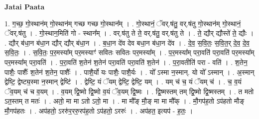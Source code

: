 \documentclass[17pt]{extarticle}
\begin{document}
\textbf{Jatai Paata} \newline

1. ग॒च्छ॒ गो॒स्थान॑म् गो॒स्थान॑म् गच्छ गच्छ गो॒स्थान᳚म् । . गो॒स्थानं॒ ॅवर्.ष॑तु॒ वर्.ष॑तु गो॒स्थान॑म् गो॒स्थानं॒ ॅवर्.ष॑तु । . गो॒स्थान॒मिति॑ गो - स्थान᳚म् । . वर्.ष॑तु ते ते॒ वर्.ष॑तु॒ वर्.ष॑तु ते । . ते॒ द्यौर् द्यौस्ते॑ ते॒ द्यौः । . द्यौर् ब॑धा॒न ब॑धा॒न द्यौर् द्यौर् ब॑धा॒न । . ब॒धा॒न दे॑व देव बधा॒न ब॑धा॒न दे॑व । . दे॒व॒ स॒वि॒तः॒ स॒वि॒त॒र् दे॒व॒ दे॒व॒ स॒वि॒तः॒ । . स॒वि॒तः॒ प॒र॒मस्या᳚म् पर॒मस्याꣳ॑ सवितः सवितः पर॒मस्या᳚म् । . प॒र॒मस्या᳚म् परा॒वति॑ परा॒वति॑ पर॒मस्या᳚म् पर॒मस्या᳚म् परा॒वति॑ । . प॒रा॒वति॑ श॒तेन॑ श॒तेन॑ परा॒वति॑ परा॒वति॑ श॒तेन॑ । . प॒रा॒वतीति॑ परा - वति॑ । . श॒तेन॒ पाशैः॒ पाशैः᳚ श॒तेन॑ श॒तेन॒ पाशैः᳚ । . पाशै॒र्यो यः पाशैः॒ पाशै॒र्यः । . यो᳚ ऽस्मा न॒स्मान्. यो यो᳚ ऽस्मान् । . अ॒स्मान् द्वेष्टि॒ द्वेष्ट्य॒स्मा न॒स्मान् द्वेष्टि॑ । . द्वेष्टि॒ यं ॅयम् द्वेष्टि॒ द्वेष्टि॒ यम् । . यम् च॑ च॒ यं ॅयम् च॑ । . च॒ व॒यं ॅव॒यम् च॑ च व॒यम् । . व॒यम् द्वि॒ष्मो द्वि॒ष्मो व॒यं ॅव॒यम् द्वि॒ष्मः । . द्वि॒ष्मस्तम् तम् द्वि॒ष्मो द्वि॒ष्मस्तम् । . त मतो ऽत॒स्तम् त मतः॑ । . अतो॒ मा मा ऽतो ऽतो॒ मा । . मा मौ᳚ङ् मौ॒ङ् मा मा मौ᳚क् । . मौ॒गप॑ह॒तो ऽप॑हतो मौङ् मौ॒गप॑हतः । . अप॑हतो॒ ऽररु॑र॒ररु॒रप॑ह॒तो ऽप॑हतो॒ ऽररुः॑ । . अप॑हत॒ इत्यप॑ - ह॒तः॒ । \newline
\end{document}
